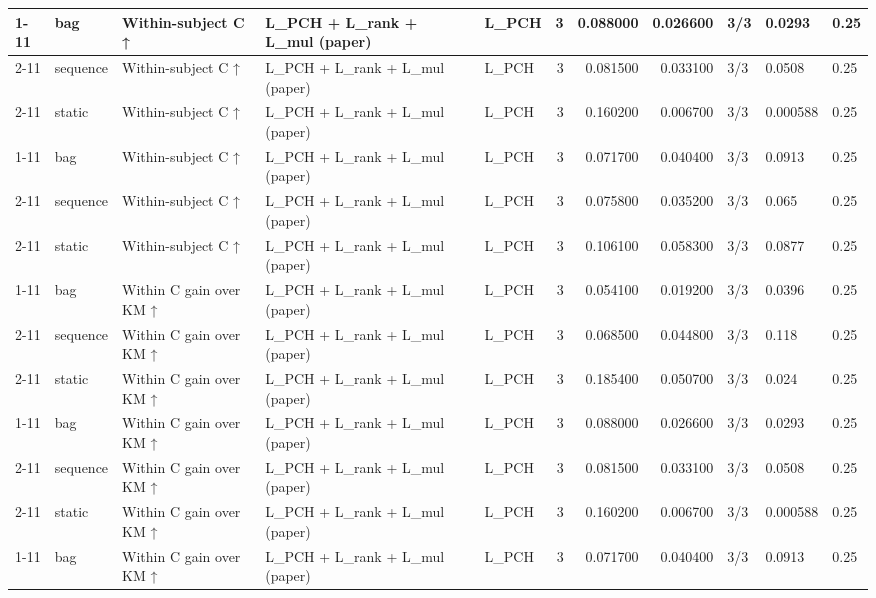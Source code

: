 \begin{tabular}{lllllrrrlll}
\cline{1-11} \cline{2-11} \cline{3-11}
\multirow[t]{3}{*}{ehrsim\_static} & bag & Within-subject C ↑ & L\_PCH + L\_rank + L\_mul (paper) & L\_PCH & 3 & 0.088000 & 0.026600 & 3/3 & 0.0293 & 0.25 \\
\cline{2-11} \cline{3-11}
 & sequence & Within-subject C ↑ & L\_PCH + L\_rank + L\_mul (paper) & L\_PCH & 3 & 0.081500 & 0.033100 & 3/3 & 0.0508 & 0.25 \\
\cline{2-11} \cline{3-11}
 & static & Within-subject C ↑ & L\_PCH + L\_rank + L\_mul (paper) & L\_PCH & 3 & 0.160200 & 0.006700 & 3/3 & 0.000588 & 0.25 \\
\cline{1-11} \cline{2-11} \cline{3-11}
\multirow[t]{3}{*}{ehrsim\_temporal} & bag & Within-subject C ↑ & L\_PCH + L\_rank + L\_mul (paper) & L\_PCH & 3 & 0.071700 & 0.040400 & 3/3 & 0.0913 & 0.25 \\
\cline{2-11} \cline{3-11}
 & sequence & Within-subject C ↑ & L\_PCH + L\_rank + L\_mul (paper) & L\_PCH & 3 & 0.075800 & 0.035200 & 3/3 & 0.065 & 0.25 \\
\cline{2-11} \cline{3-11}
 & static & Within-subject C ↑ & L\_PCH + L\_rank + L\_mul (paper) & L\_PCH & 3 & 0.106100 & 0.058300 & 3/3 & 0.0877 & 0.25 \\
\cline{1-11} \cline{2-11} \cline{3-11}
\multirow[t]{3}{*}{ehrsim\_base} & bag & Within C gain over KM ↑ & L\_PCH + L\_rank + L\_mul (paper) & L\_PCH & 3 & 0.054100 & 0.019200 & 3/3 & 0.0396 & 0.25 \\
\cline{2-11} \cline{3-11}
 & sequence & Within C gain over KM ↑ & L\_PCH + L\_rank + L\_mul (paper) & L\_PCH & 3 & 0.068500 & 0.044800 & 3/3 & 0.118 & 0.25 \\
\cline{2-11} \cline{3-11}
 & static & Within C gain over KM ↑ & L\_PCH + L\_rank + L\_mul (paper) & L\_PCH & 3 & 0.185400 & 0.050700 & 3/3 & 0.024 & 0.25 \\
\cline{1-11} \cline{2-11} \cline{3-11}
\multirow[t]{3}{*}{ehrsim\_static} & bag & Within C gain over KM ↑ & L\_PCH + L\_rank + L\_mul (paper) & L\_PCH & 3 & 0.088000 & 0.026600 & 3/3 & 0.0293 & 0.25 \\
\cline{2-11} \cline{3-11}
 & sequence & Within C gain over KM ↑ & L\_PCH + L\_rank + L\_mul (paper) & L\_PCH & 3 & 0.081500 & 0.033100 & 3/3 & 0.0508 & 0.25 \\
\cline{2-11} \cline{3-11}
 & static & Within C gain over KM ↑ & L\_PCH + L\_rank + L\_mul (paper) & L\_PCH & 3 & 0.160200 & 0.006700 & 3/3 & 0.000588 & 0.25 \\
\cline{1-11} \cline{2-11} \cline{3-11}
\multirow[t]{3}{*}{ehrsim\_temporal} & bag & Within C gain over KM ↑ & L\_PCH + L\_rank + L\_mul (paper) & L\_PCH & 3 & 0.071700 & 0.040400 & 3/3 & 0.0913 & 0.25 \\

\end{tabular}

